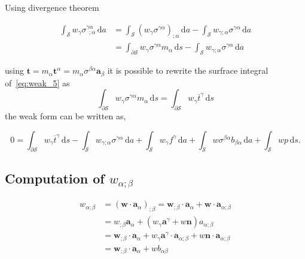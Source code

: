 \documentclass[../main.tex]{subfiles}
\begin{document}
\begin{appendices}
        Using divergence theorem
        
        \begin{equation}\label{eq:weak_5}
            \begin{split}
                \int_{\mathcal{S}} w_{\gamma} \sigma^{\gamma \alpha}_{~~; \alpha} \, \mathrm{d} a &= \int_{\mathcal{S}} \left( w_{\gamma} \sigma^{\gamma \alpha} \right)_{; \alpha} \, \mathrm{d} a - \int_{\mathcal{S}} w_{\gamma ; \alpha} \sigma^{\gamma \alpha} \, \mathrm{d} a \\ &= \int_{\partial \mathcal{S}} w_{\gamma} \sigma^{\gamma \alpha} m_{\alpha} \, \mathrm{d} s - \int_{\mathcal{S}} w_{\gamma ; \alpha} \sigma^{\gamma \alpha} \, \mathrm{d} a
            \end{split}
        \end{equation}
        
        using $ \boldsymbol{t} = m_{\alpha} \boldsymbol{t}^{\alpha} = m_{\alpha} \sigma^{\beta \alpha} \boldsymbol{a}_{\beta} $ it is possible to rewrite the surfrace integral of~\eqref{eq:weak_5} as
\begin{equation}\label{eq:weak_6}
    \int_{\partial \mathcal{S}} w_{\gamma} \sigma^{\gamma \alpha} m_{\alpha} \, \mathrm{d} s = \int_{\partial \mathcal{S}} w_{\gamma} \overline{t}^{\gamma} \, \mathrm{d} s
\end{equation}
the weak form can be written as,
    
    \begin{equation}\label{eq:wear_7}
    0 = \int_{\partial \mathcal{S}} w_{\gamma} \overline{t}^{\gamma} \, \mathrm{d} s - \int_{\mathcal{S}} w_{\gamma ; \alpha} \sigma^{\gamma \alpha} \, \mathrm{d} a + \int_{\mathcal{S}} w_{\gamma} f^{\gamma} \, \mathrm{d} a + \int_{\mathcal{S}} w \sigma^{\beta \alpha} b_{\beta \alpha} \, \mathrm{d} a + \int_{\mathcal{S}} w p \, \mathrm{d} s.
    \end{equation}
    \subsection{Computation of \texorpdfstring{$w_{\alpha ; \beta}$}{w-a;b}}
    \begin{equation}\label{appendices:w_ab}
        \begin{split}
            w_{\alpha ; \beta} &= \left( \boldsymbol{w} \cdot \boldsymbol{a}_{\alpha} \right)_{; \beta} = \boldsymbol{w}_{; \beta} \cdot \boldsymbol{a}_{\alpha} + \boldsymbol{w} \cdot \boldsymbol{a}_{\alpha ; \beta} \\ &= w_{; \beta} \boldsymbol{a}_{\alpha} + \left( w_{\gamma} \boldsymbol{a}^{\gamma} + w \boldsymbol{n} \right) a_{\alpha ; \beta} \\ &= \boldsymbol{w}_{; \beta} \cdot \boldsymbol{a}_{\alpha} + w_{\gamma} \boldsymbol{a}^{\gamma} \cdot \boldsymbol{a}_{\alpha ; \beta} + w \boldsymbol{n} \cdot \boldsymbol{a}_{\alpha ; \beta} \\ &= \boldsymbol{w}_{; \beta} \cdot \boldsymbol{a}_{\alpha} + w b_{\alpha \beta}
        \end{split}
    \end{equation}

\end{appendices}
\end{document}
